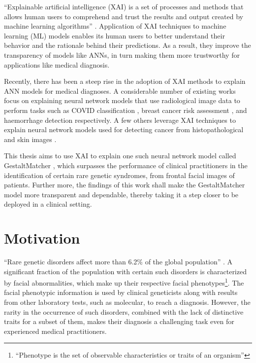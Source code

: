 \documentclass[../report.tex]{subfiles}
\begin{document}
	\enquote{Explainable artificial intelligence (XAI) is a set of processes and methods that allows human users to comprehend and trust the results and output created by machine learning algorithms} \cite{BibEntry2021Mar}. Application of XAI techniques to machine learning (ML) models enables its human users to better understand their behavior and the rationale behind their predictions. As a result, they improve the transparency of models like ANNs, in turn making them more trustworthy for applications like medical diagnosis.
	
	Recently, there has been a steep rise in the adoption of XAI methods to explain ANN models for medical diagnoses. A considerable number of existing works focus on explaining neural network models that use radiological image data to perform tasks such as COVID classification \cite{ghoshal2020estimating}, breast cancer risk assessment \cite{qian2021prospective}, and haemorrhage detection \cite{lee2019explainable} respectively. A few others leverage XAI techniques to explain neural network models used for detecting cancer from histopathological \cite{binder2021morphological} and skin images \cite{nunnari2021overlap}. 
	
	This thesis aims to use XAI to explain one such neural network model called GestaltMatcher \cite{hsieh2022gestaltmatcher}, which surpasses the performance of clinical practitioners in the identification of certain rare genetic syndromes, from frontal facial images of patients. Further more, the findings of this work shall make the GestaltMatcher model more transparent and dependable, thereby taking it a step closer to be deployed in a clinical setting.
	
	

    \section{Motivation}
    \noindent
    \enquote{Rare genetic disorders affect more than 6.2\% of the global population} \cite{hsieh2022gestaltmatcher}. A significant fraction of the population with certain such disorders is characterized by facial abnormalities, which make up their respective facial phenotypes\footnote{\enquote{Phenotype is the set of observable characteristics or traits of an organism}\cite{wiki_pheno}}. The facial phenotypic information is used by clinical geneticists along with results from other laboratory tests, such as molecular, to reach a diagnosis. However, the rarity in the occurrence of such disorders, combined with the lack of distinctive traits for a subset of them, makes their diagnosis a challenging task even for experienced medical practitioners.  
    
\end{document}
